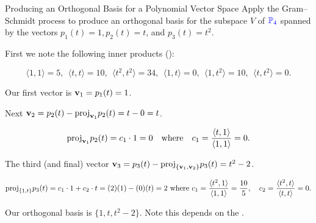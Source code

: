\documentclass[xcolor=dvipsnames,aspectratio=169,t]{beamer}
\begin{document}
\begin{frame}{Producing an Orthogonal Basis for a Polynomial Vector Space}
  Apply the \alert{Gram--Schmidt process} to produce an \alert{orthogonal basis} for the subspace $V$ of $\textcolor{blue}{\mathbb{P}_4}$ spanned by the vectors $p_1(t)=1, p_2(t)=t$, and $p_3(t)=t^2$.
  \smallskip

  \pause
  First we note the following inner products ():
  \vspace*{-1em}
  
  \[ \langle 1 , 1 \rangle = 5,  \ \ \langle t , t \rangle = 10, \ \ \langle t^2 , t^2 \rangle = 34, \ \ \langle 1 , t \rangle = 0 , \ \ \langle 1 , t^2 \rangle = 10, \ \  \langle t , t^2 \rangle = 0. \]

  \pause
  \bi 
  \ii Our first vector is $\mathbf{v}_1 = p_1(t) = 1$.
  \medskip
  
  \pause
  \ii Next $\mathbf{v}_2 = p_2(t) - \mbox{proj}_{\mathbf{v}_1} p_2(t) = t - 0 = t$.
  \vspace*{-1em}

  \[ \mbox{proj}_{\mathbf{v}_1} p_2(t) = c_1 \cdot 1 = 0   \quad \mbox{where} \quad 
  c_1 = \frac{\langle t , 1 \rangle}{\langle 1 , 1 \rangle} = 0. \]

  \pause
  \ii The third (and final) vector $\mathbf{v}_3 = p_3(t) - \mbox{proj}_{\{\mathbf{v}_1 , \mathbf{v}_2\}} p_3(t) = t^2 - 2$.
  \vspace*{-1em}

  {\small \[ \mbox{proj}_{\{1, t\}} p_3(t) = c_1 \cdot 1 + c_2 \cdot t= (2)(1)-(0)(t) = 2 \mbox{ where }
  c_1 = \frac{\langle t^2,1 \rangle}{\langle 1,1 \rangle} = \frac{10}{5}, \quad
  c_2 = \frac{\langle t^2,t \rangle}{\langle t,t \rangle} = 0.  \]}
  \ei
  
  \pause
  Our \alert{orthogonal basis} is $\{1,t,t^2-2\}$.  Note this depends on the .
\end{frame}
\end{document}
